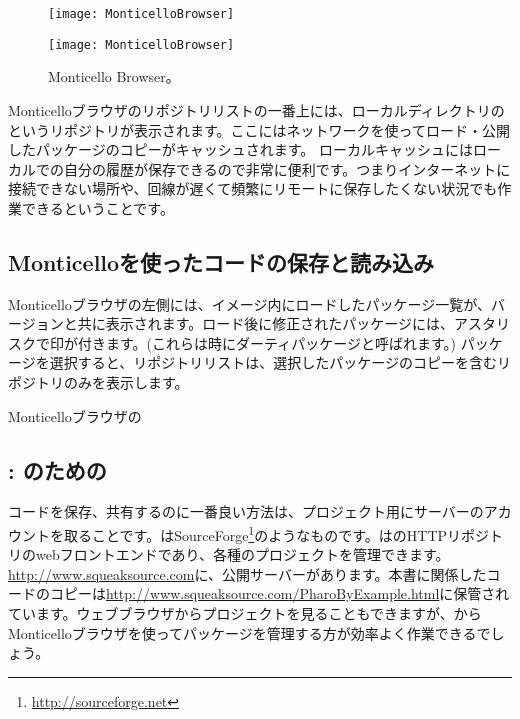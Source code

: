 \documentclass[a4paper,10pt,twoside]{book}
\begin{document}
\begin{figure}[hbt]
\ifluluelse
	{\centerline {\texttt{[image: MonticelloBrowser]}}}
	{\centerline {\texttt{[image: MonticelloBrowser]}}}
\caption{Monticello Browser。
}
\end{figure}

Monticelloブラウザのリポジトリリストの一番上には、ローカルディレクトリの というリポジトリが表示されます。ここにはネットワークを使ってロード・公開したパッケージのコピーがキャッシュされます。
ローカルキャッシュにはローカルでの自分の履歴が保存できるので非常に便利です。つまりインターネットに接続できない場所や、回線が遅くて頻繁にリモートに保存したくない状況でも作業できるということです。

\subsection{Monticelloを使ったコードの保存と読み込み}
Monticelloブラウザの左側には、イメージ内にロードしたパッケージ一覧が、バージョンと共に表示されます。ロード後に修正されたパッケージには、アスタリスクで印が付きます。(これらは時にダーティパッケージと呼ばれます。) パッケージを選択すると、リポジトリリストは、選択したパッケージのコピーを含むリポジトリのみを表示します。


Monticelloブラウザの

\subsection{\ind{\sqsrc}: \pharo のための}

コードを保存、共有するのに一番良い方法は、プロジェクト用に\sqsrc サーバーのアカウントを取ることです。\sqsrc はSourceForge\footnote{\url{http://sourceforge.net}}のようなものです。\sqsrc はのHTTPリポジトリのwebフロントエンドであり、各種のプロジェクトを管理できます。
\url{http://www.squeaksource.com}に、公開\sqsrc サーバーがあります。本書に関係したコードのコピーは\url{http://www.squeaksource.com/PharoByExample.html}に保管されています。ウェブブラウザからプロジェクトを見ることもできますが、\pharo からMonticelloブラウザを使ってパッケージを管理する方が効率よく作業できるでしょう。
\end{document}
